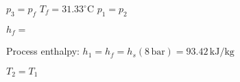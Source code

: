 \( p_3 = p_f \)  
\( T_f = 31.33^\circ \text{C} \)  
\( p_1 = p_2 \)  

\( h_f = \)  

Process enthalpy:  
\( h_1 = h_f = h_s(8 \, \text{bar}) = 93.42 \, \text{kJ/kg} \)  

\( T_2 = T_1 \)
